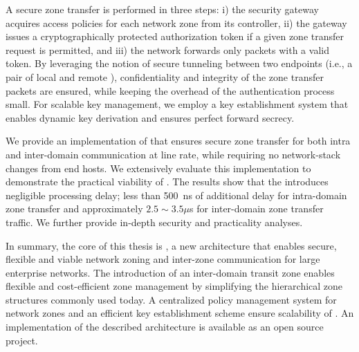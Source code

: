 A secure zone transfer is performed in three steps: i) the security gateway
acquires access policies for each network zone from its controller, ii) the
gateway issues a cryptographically protected authorization token if a given zone
transfer request is permitted, and iii) the network forwards only packets with a
valid token. By leveraging the notion of secure tunneling between two endpoints
(i.e., a pair of local and remote \tps), confidentiality and integrity of the
zone transfer packets are ensured, while keeping the overhead of the
authentication process small. For scalable key management, we employ a key
establishment system that enables dynamic key derivation and ensures perfect
forward secrecy.

We provide an implementation of \name that ensures secure zone transfer for
both intra and inter-domain communication at line rate, while requiring no network-stack
changes from end hosts. We extensively evaluate this implementation to demonstrate
the practical viability of \name. The results show that the \tp introduces negligible
processing delay; less than \SI{500}{ns} of additional delay for intra-domain zone transfer
and approximately $2.5 \sim 3.5 \mu$s for inter-domain zone transfer traffic. We further
provide in-depth security and practicality analyses.


In summary, the core of this thesis is \name, a new architecture that enables secure, flexible
and viable network zoning and inter-zone communication for large enterprise
networks. The introduction of an inter-domain transit zone enables flexible and
cost-efficient zone management by simplifying the hierarchical zone structures commonly used
today. A centralized policy management system  for network zones and an efficient key establishment
scheme ensure scalability of \name. An implementation of the described
architecture is available as an open source project.
